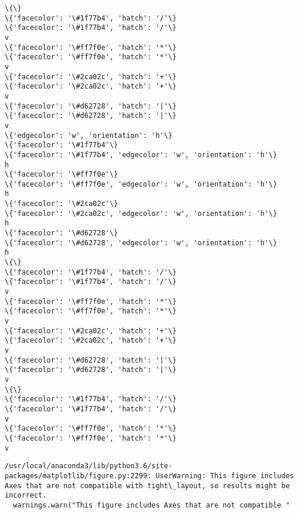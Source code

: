 \documentclass[11pt]{article}
\begin{document}
    \begin{Verbatim}[commandchars=\\\{\}]
\{\}
\{'facecolor': '\#1f77b4', 'hatch': '/'\}
\{'facecolor': '\#1f77b4', 'hatch': '/'\}
v
\{'facecolor': '\#ff7f0e', 'hatch': '*'\}
\{'facecolor': '\#ff7f0e', 'hatch': '*'\}
v
\{'facecolor': '\#2ca02c', 'hatch': '+'\}
\{'facecolor': '\#2ca02c', 'hatch': '+'\}
v
\{'facecolor': '\#d62728', 'hatch': '|'\}
\{'facecolor': '\#d62728', 'hatch': '|'\}
v
\{'edgecolor': 'w', 'orientation': 'h'\}
\{'facecolor': '\#1f77b4'\}
\{'facecolor': '\#1f77b4', 'edgecolor': 'w', 'orientation': 'h'\}
h
\{'facecolor': '\#ff7f0e'\}
\{'facecolor': '\#ff7f0e', 'edgecolor': 'w', 'orientation': 'h'\}
h
\{'facecolor': '\#2ca02c'\}
\{'facecolor': '\#2ca02c', 'edgecolor': 'w', 'orientation': 'h'\}
h
\{'facecolor': '\#d62728'\}
\{'facecolor': '\#d62728', 'edgecolor': 'w', 'orientation': 'h'\}
h
\{\}
\{'facecolor': '\#1f77b4', 'hatch': '/'\}
\{'facecolor': '\#1f77b4', 'hatch': '/'\}
v
\{'facecolor': '\#ff7f0e', 'hatch': '*'\}
\{'facecolor': '\#ff7f0e', 'hatch': '*'\}
v
\{'facecolor': '\#2ca02c', 'hatch': '+'\}
\{'facecolor': '\#2ca02c', 'hatch': '+'\}
v
\{'facecolor': '\#d62728', 'hatch': '|'\}
\{'facecolor': '\#d62728', 'hatch': '|'\}
v
\{\}
\{'facecolor': '\#1f77b4', 'hatch': '/'\}
\{'facecolor': '\#1f77b4', 'hatch': '/'\}
v
\{'facecolor': '\#ff7f0e', 'hatch': '*'\}
\{'facecolor': '\#ff7f0e', 'hatch': '*'\}
v

    \end{Verbatim}

    \begin{Verbatim}[commandchars=\\\{\}]
/usr/local/anaconda3/lib/python3.6/site-packages/matplotlib/figure.py:2299: UserWarning: This figure includes Axes that are not compatible with tight\_layout, so results might be incorrect.
  warnings.warn("This figure includes Axes that are not compatible "

    \end{Verbatim}

    \begin{center}
    \end{center}
    { \hspace*{\fill} \\}
    
    \begin{center}
    \end{center}
    { \hspace*{\fill} \\}
    

    
    
    
    
\end{document}
